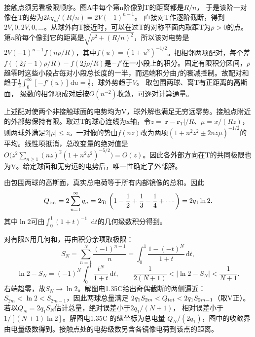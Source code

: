 \documentclass[UTF8,fontset=fandol,a4paper,11pt]{ctexart}
\newcommand{\dd}{\mathop{}\!\mathrm{d}}
\begin{document}
接触点须另看极限顺序。图A中每个第n阶像到T的距离都是$R/n$，
于是该阶一对像在T的势为$2kq_n/(R/n)=2V(-1)^{n-1}$。
直接对T作逐阶截断，得到$2V,0,2V,0,\ldots$。从球外向T接近时，可以在过T的对称平面内取距T为$\rho>0$的点。第$n$阶每个像到它的距离是$\sqrt{\rho^2+(R/n)^2}$，所以该对电势是$2V(-1)^{n-1}f(n\rho/R)$，其中$f(u)=(1+u^2)^{-1/2}$。把相邻两项配对，每个差$f((2j-1)\rho/R)-f(2j\rho/R)$是$-f'$在一小段上的积分。固定有限积分区间，$\rho$趋零时这些小段占每对小段总长度的一半，而远端积分由$f$的衰减控制。故配对和趋于$\tfrac12\int_0^\infty[-f'(u)]\,\mathrm du=\tfrac12$，球外势趋于$V$。
取包围两球、离T有正距离的高斯面，
级数的相邻项成对后按$O(n^{-2})$收敛，可逐对计算通量。

上述配对使两个非接触球面的电势均为V，球外解也满足无穷远零势。接触点附近的外部势保持有限。取过T的球心连线为x轴，令$z=|\boldsymbol r-\boldsymbol r_T|/R$、$\mu=x/(Rz)$，则两球外满足$2|\mu|\le z$。一对像的势由$f(nz)$改为两项$(1+n^2z^2\pm2nz\mu)^{-1/2}$的平均。线性项抵消，总改变量的绝对值是$O\bigl(z^2\sum_{n\ge1}(nz)^2(1+n^2z^2)^{-5/2}\bigr)=O(z)$。因此各外部方向在T的共同极限也为V。给定球面和无穷远的电势后，唯一性确定了外部解。

由包围两球的高斯面，真实总电荷等于所有内部镜像的总和。因此
\[Q_{\rm tot}=2\sum_{n=1}^\infty q_n
=2q_1\left(1-\frac12+\frac13-\frac14+\cdots\right)=2q_1\ln2.
\]
其中$\ln2$可由$\int_0^1(1+t)^{-1}\dd t$的几何级数积分得到。

对有限N用几何和，再由积分余项取极限：
\[
S_N=\sum_{n=1}^{N}\frac{(-1)^{n-1}}n
=\int_0^1\frac{1-(-t)^N}{1+t}\,\mathrm dt,
\]
\[
\ln2-S_N=(-1)^N\int_0^1\frac{t^N}{1+t}\,\mathrm dt,\qquad
\frac1{2(N+1)}<|\ln2-S_N|<\frac1{N+1}.
\]
右端趋零，故$S_N\to\ln2$。解图电1.35C给出奇偶截断的两侧逼近：
$S_{2m}<\ln2<S_{2m-1}$，因此两球总量满足
$2q_1S_{2m}<Q_{\rm tot}<2q_1S_{2m-1}$（取V正）。
若以$Q_N=2q_1S_N$估计总量，绝对误差小于$2q_1/(N+1)$，
相对误差小于 $1/[(N+1)\ln2]$。解图电1.35C 的纵坐标为总电量 $Q_N/(2q_1)$，图中的收敛界由电量级数得到。接触点处的电势级数另含各镜像电荷到该点的距离。
\end{document}
